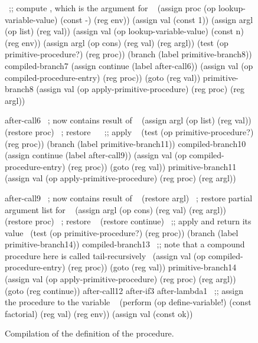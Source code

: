 \begin{figure}
\begin{smallscheme}
	  ~\textrm{;; compute , which is the argument for }~
	    (assign proc
	            (op lookup-variable-value)
	            (const -)
	            (reg env))
	    (assign val (const 1))
	    (assign argl (op list) (reg val))
	    (assign val
	            (op lookup-variable-value)
	            (const n)
	            (reg env))
	    (assign argl (op cons) (reg val) (reg argl))
	    (test (op primitive-procedure?) (reg proc))
	    (branch (label primitive-branch8))
	  compiled-branch7
	    (assign continue (label after-call6))
	    (assign val (op compiled-procedure-entry) (reg proc))
	    (goto (reg val))
	  primitive-branch8
	    (assign val
	            (op apply-primitive-procedure)
	            (reg proc)
	            (reg argl))

	  after-call6   ~\textrm{;  now contains result of }~
	    (assign argl (op list) (reg val))
	    (restore proc) ~\textrm{; restore }~
	  ~\textrm{;; apply }~
	    (test (op primitive-procedure?) (reg proc))
	    (branch (label primitive-branch11))
	  compiled-branch10
	    (assign continue (label after-call9))
	    (assign val (op compiled-procedure-entry) (reg proc))
	    (goto (reg val))
	  primitive-branch11
	    (assign val
	            (op apply-primitive-procedure)
	            (reg proc)
	            (reg argl))

	  after-call9      ~\textrm{;  now contains result of }~
	    (restore argl) ~\textrm{; restore partial argument list for \code{*}}~
	    (assign argl (op cons) (reg val) (reg argl))
	    (restore proc) ~\textrm{; restore \code{*}}~
	    (restore continue)
	  ~\textrm{;; apply \code{*} and return its value}~
	    (test (op primitive-procedure?) (reg proc))
	    (branch (label primitive-branch14))
	  compiled-branch13
	  ~\textrm{;; note that a compound procedure here is called tail-recursively}~
	    (assign val (op compiled-procedure-entry) (reg proc))
	    (goto (reg val))
	  primitive-branch14
	    (assign val
	            (op apply-primitive-procedure)
	            (reg proc)
	            (reg argl))
	    (goto (reg continue))
	  after-call12
	  after-if3
	  after-lambda1
	  ~\textrm{;; assign the procedure to the variable }~
	    (perform (op define-variable!)
	             (const factorial)
	             (reg val)
	             (reg env))
	    (assign val (const ok))
	\end{smallscheme}
	\caption{
		Compilation of the definition of the  procedure.
	}
	\label{Figure 5.17}
\end{figure}



